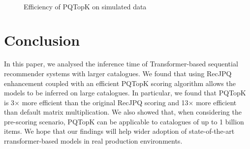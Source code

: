 \documentclass[sigconf,natbib=true, review=true]{acmart} %
\begin{document}
\begin{figure}
    \centering

        \\
    \caption{Efficiency of PQTopK on simulated data}
    \label{fig:simulate_effectiveness}
\end{figure}

\section{Conclusion}\label{sec:conclusion}
In this paper, we analysed the inference time of Transformer-based sequential recommender systems with larger catalogues.  We found that using RecJPQ enhancement coupled with an efficient PQTopK scoring algorithm allows the models to be inferred on large catalogues. In particular, we found that PQTopK is 3$\times$ more efficient than the original RecJPQ scoring and 13$\times$ more efficient than default matrix multiplication. We also showed that, when considering the pre-scoring scenario, PQTopK can be applicable to catalogues of up to 1 billion items. We hope that our findings will help wider adoption of state-of-the-art rransformer-based models in real production environments. 
\end{document}
